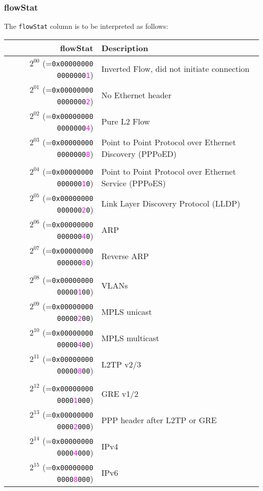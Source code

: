 \documentclass[documentation]{subfiles}
\begin{document}
\subsubsection{flowStat}\label{flowStat}
The {\tt flowStat} column is to be interpreted as follows:
\begin{longtable}{rl}
    \toprule
    {\bf flowStat} & {\bf Description}\\
    \midrule\endhead%
    $2^{00}$ (={\tt 0x00000000 0000000\textcolor{magenta}{1}}) & Inverted Flow, did not initiate connection\\
    $2^{01}$ (={\tt 0x00000000 0000000\textcolor{magenta}{2}}) & No Ethernet header\\
    $2^{02}$ (={\tt 0x00000000 0000000\textcolor{magenta}{4}}) & Pure L2 Flow\\
    $2^{03}$ (={\tt 0x00000000 0000000\textcolor{magenta}{8}}) & Point to Point Protocol over Ethernet Discovery (PPPoED)\\
    \\
    $2^{04}$ (={\tt 0x00000000 000000\textcolor{magenta}{1}0}) & Point to Point Protocol over Ethernet Service (PPPoES)\\
    $2^{05}$ (={\tt 0x00000000 000000\textcolor{magenta}{2}0}) & Link Layer Discovery Protocol (LLDP)\\
    $2^{06}$ (={\tt 0x00000000 000000\textcolor{magenta}{4}0}) & ARP\\
    $2^{07}$ (={\tt 0x00000000 000000\textcolor{magenta}{8}0}) & Reverse ARP\\
    \\
    $2^{08}$ (={\tt 0x00000000 00000\textcolor{magenta}{1}00}) & VLANs\\
    $2^{09}$ (={\tt 0x00000000 00000\textcolor{magenta}{2}00}) & MPLS unicast\\
    $2^{10}$ (={\tt 0x00000000 00000\textcolor{magenta}{4}00}) & MPLS multicast\\
    $2^{11}$ (={\tt 0x00000000 00000\textcolor{magenta}{8}00}) & L2TP v2/3\\
    \\
    $2^{12}$ (={\tt 0x00000000 0000\textcolor{magenta}{1}000}) & GRE v1/2\\
    $2^{13}$ (={\tt 0x00000000 0000\textcolor{magenta}{2}000}) & PPP header after L2TP or GRE\\
    $2^{14}$ (={\tt 0x00000000 0000\textcolor{magenta}{4}000}) & IPv4\\
    $2^{15}$ (={\tt 0x00000000 0000\textcolor{magenta}{8}000}) & IPv6\\

\end{longtable}
\end{document}
